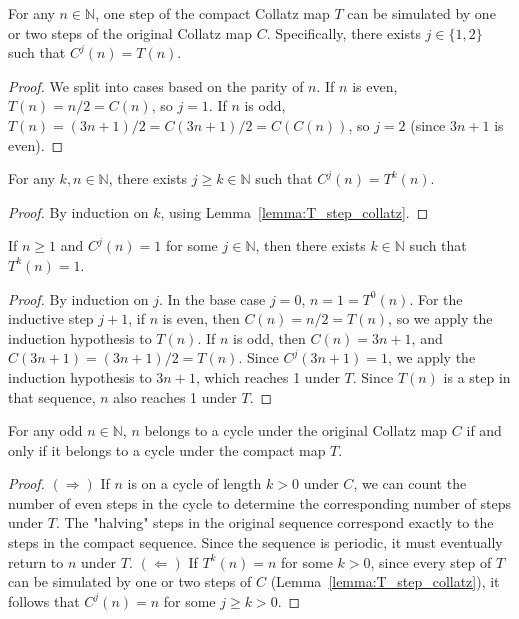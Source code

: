 \begin{lemma}\label{lemma:T_step_collatz}\leanok
For any $n \in \mathbb{N}$, one step of the compact Collatz map $T$ can be simulated by one or two
steps of the original Collatz map $C$. Specifically, there exists $j \in \{1, 2\}$ such that $C^j(n) = T(n)$.
\end{lemma}
\begin{proof}\leanok
We split into cases based on the parity of $n$.
If $n$ is even, $T(n) = n/2 = C(n)$, so $j=1$.
If $n$ is odd, $T(n) = (3n+1)/2 = C(3n+1)/2 = C(C(n))$, so $j=2$ (since $3n+1$ is even).
\end{proof}

\begin{lemma}\label{lemma:T_iter_implies_collatz_iter}\leanok
For any $k, n \in \mathbb{N}$, there exists $j\ge k \in \mathbb{N}$ such that $C^j(n) = T^k(n)$.
\end{lemma}
\begin{proof}\leanok
By induction on $k$, using Lemma~\ref{lemma:T_step_collatz}.
\end{proof}

\begin{lemma}\label{lemma:collatz_iter_to_T_iter}\leanok
If $n \ge 1$ and $C^j(n) = 1$ for some $j \in \mathbb{N}$, then there exists $k \in \mathbb{N}$ such that $T^k(n) = 1$.
\end{lemma}
\begin{proof}\leanok
By induction on $j$. In the base case $j=0$, $n=1=T^0(n)$. For the inductive step $j+1$, if $n$ is even, then $C(n) = n/2 = T(n)$, so we apply the induction hypothesis to $T(n)$. If $n$ is odd, then $C(n) = 3n+1$, and $C(3n+1) = (3n+1)/2 = T(n)$. Since $C^j(3n+1) = 1$, we apply the induction hypothesis to $3n+1$, which reaches 1 under $T$. Since $T(n)$ is a step in that sequence, $n$ also reaches 1 under $T$.
\end{proof}

\begin{lemma}\label{lemma:collatz_cycle_iff_compact_collatz_cycle}\leanok
For any odd $n \in \mathbb{N}$, $n$ belongs to a cycle under the original Collatz map $C$ if and only if it belongs to a cycle under the compact map $T$.
\end{lemma}
\begin{proof}\leanok
$(\Rightarrow)$ If $n$ is on a cycle of length $k > 0$ under $C$, we can count the number of even steps in the cycle to determine the corresponding number of steps under $T$. The "halving" steps in the original sequence correspond exactly to the steps in the compact sequence. Since the sequence is periodic, it must eventually return to $n$ under $T$.
$(\Leftarrow)$ If $T^k(n) = n$ for some $k > 0$, since every step of $T$ can be simulated by one or two steps of $C$ (Lemma~\ref{lemma:T_step_collatz}), it follows that $C^j(n) = n$ for some $j \ge k > 0$.
\end{proof}

